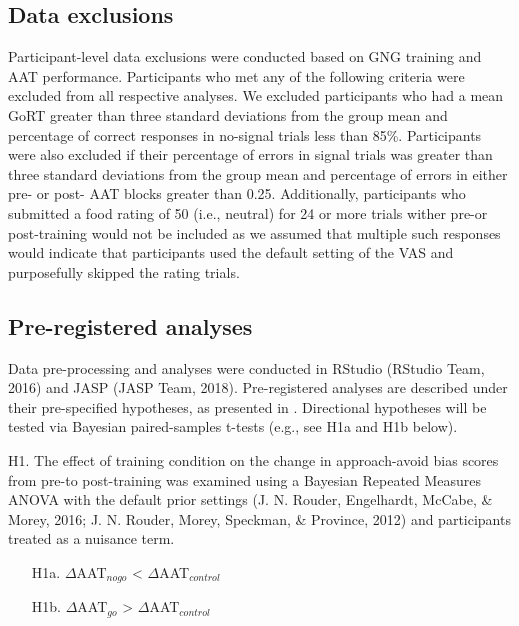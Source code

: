 \documentclass[man,floatsintext]{apa6}
\begin{document}
\subsection{Data exclusions}\label{data_exclusions}

\par

Participant-level data exclusions were conducted based on GNG training
and AAT performance. Participants who met any of the following criteria
were excluded from all respective analyses. We excluded participants who
had a mean GoRT greater than three standard deviations from the group
mean and percentage of correct responses in no-signal trials less than
85\%. Participants were also excluded if their percentage of errors in
signal trials was greater than three standard deviations from the group
mean and percentage of errors in either pre- or post- AAT blocks greater
than 0.25. Additionally, participants who submitted a food rating of 50
(i.e., neutral) for 24 or more trials wither pre-or post-training would
not be included as we assumed that multiple such responses would
indicate that participants used the default setting of the VAS and
purposefully skipped the rating trials.

\subsection{Pre-registered analyses}\label{prereg_analyses}

\par

Data pre-processing and analyses were conducted in RStudio (RStudio
Team, 2016) and JASP (JASP Team, 2018). Pre-registered analyses are
described under their pre-specified hypotheses, as presented in
\textit{}. Directional hypotheses will be tested via
Bayesian paired-samples t-tests (e.g., see H1a and H1b below).

\noindent H1. The effect of training condition on the change in
approach-avoid bias scores from pre-to post-training was examined using
a Bayesian Repeated Measures ANOVA with the default prior settings (J.
N. Rouder, Engelhardt, McCabe, \& Morey, 2016; J. N. Rouder, Morey,
Speckman, \& Province, 2012) and participants treated as a nuisance
term.

\begin{itemize}
\item[H1a.] $\Delta$AAT$_{nogo}$ <  $\Delta$AAT$_{control}$  
\item[H1b.] $\Delta$AAT$_{go}$ >  $\Delta$AAT$_{control}$
\end{itemize}
\end{document}
